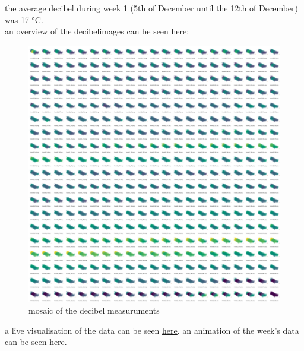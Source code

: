 \FloatBarrier 
the average decibel during week 1 (5th of December until the 12th of December) was 17 °C. \\an overview of the decibelimages can be seen here:\begin{figure}[hbt!] 
\centering 
\includegraphics[width=\textwidth]{reports/current_report/images/montage_decibel.jpg}  
\caption{mosaic of the decibel measuruments} 
\end{figure} 
\FloatBarrier 
a live visualisation of the data can be seen \href{https://data.hasdata.xyz/}{here}. an animation of the week's data can be seen \href{https://data.hasdata.xyz/}{here}. 